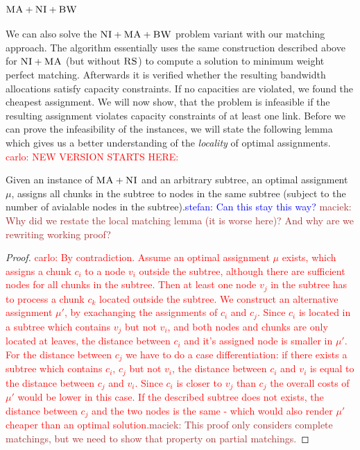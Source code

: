 \documentclass[9pt]{sigcomm-alternate}
\newcommand{\carlo}[1]{\textcolor{red}{carlo: #1}}
\newcommand{\maciek}[1]{\textcolor{brown}{maciek: #1}}
\newcommand{\stefan}[1]{\textcolor{blue}{stefan: #1}}
\newcommand{\VmChunkAssignment}{\mu}
\newcommand{\VirtualNode}{v}
\newcommand{\achunk}{\ensuremath{c}}
\newcommand{\CC}{\textsc{NI}}
\newcommand{\RS}{\textsc{RS}}
\newcommand{\BW}{\textsc{BW}}
\newcommand{\MA}{\textsc{MA}}
\begin{document}
\subsubsection{$\MA+\CC+\BW$}

We can also solve the $\CC+\MA+\BW$ problem variant with our matching approach. 
The algorithm 
essentially uses
the same construction described above for $\CC+\MA$ (but without $\RS$) to 
compute a solution
to minimum weight perfect matching. Afterwards it is verified whether the
resulting bandwidth allocations satisfy capacity constraints. If
no capacities are violated, we found the cheapest assignment. We will
now show, that the problem is infeasible if the resulting assignment
violates capacity constraints of at least one link. 
Before we can prove the infeasibility of the instances, we will 
state the following lemma
which gives us a better understanding of the \emph{locality} of optimal 
assignments.
\carlo{NEW VERSION STARTS HERE:}

\begin{lemma}
\label{lemma:local}
Given an instance of $\MA+\CC$ and an arbitrary subtree, an optimal assignment 
$\VmChunkAssignment$, assigns all chunks in the subtree to nodes in the same 
subtree (subject to the number of avialable nodes in the 
subtree).\stefan{Can this stay this way?} \maciek{Why did we restate
  the local matching lemma (it is worse here)? And why are we rewriting working proof?}
\end{lemma}


\begin{proof}
\carlo{
By contradiction. Assume an optimal assignment $\VmChunkAssignment$ exists, 
which assigns a chunk $\achunk_i$ to a node $\VirtualNode_i$ outside the 
subtree, although there are sufficient nodes for all chunks in the subtree. 
Then 
at least one node $\VirtualNode_j$ in the subtree has to process a chunk 
$\achunk_k$ located outside the subtree. We construct an alternative 
assignment $\VmChunkAssignment'$, by exachanging the assignments of 
$\achunk_i$ and $\achunk_j$. Since $\achunk_i$ is located in a subtree which 
contains $\VirtualNode_j$ but not $\VirtualNode_i$, and both nodes and chunks 
are only located at leaves, the distance between $\achunk_i$ and it's assigned 
node is smaller in $\VmChunkAssignment'$. For the distance between $\achunk_j$ 
we have to do a case differentiation: if there exists a subtree which 
contains $\achunk_i$, $\achunk_j$ but not $\VirtualNode_i$, the distance 
between $\achunk_i$ and $\VirtualNode_i$ is equal to the distance between 
$\achunk_j$ and $\VirtualNode_i$. Since $\achunk_i$ is closer to 
$\VirtualNode_j$ than $\achunk_j$ the overall costs of $\VmChunkAssignment'$ 
would be lower in this case. If the described subtree does not exists, the 
distance between $\achunk_j$ and the two nodes is the same - which would also 
render $\VmChunkAssignment'$ cheaper than an optimal
solution.}\maciek{This proof only considers complete matchings, but we
need to show that property on partial matchings.}
\end{proof}
\end{document}
